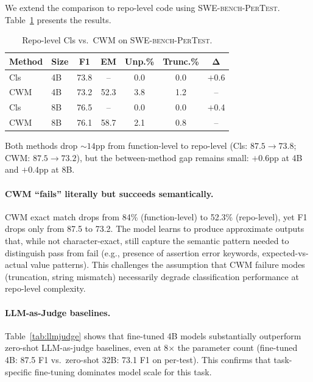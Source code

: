\documentclass[11pt,a4paper]{article}
\begin{document}
We extend the comparison to repo-level code using \textsc{SWE-bench-PerTest}.
Table~\ref{tab:repo} presents the results.

\begin{table}[t]
\centering
\small
\caption{Repo-level Cls vs.\ CWM on \textsc{SWE-bench-PerTest}.}
\label{tab:repo}
\begin{tabular}{llccccc}
\toprule
\textbf{Method} & \textbf{Size} & \textbf{F1} & \textbf{EM} & \textbf{Unp.\%} & \textbf{Trunc.\%} & $\boldsymbol{\Delta}$ \\
\midrule
Cls & 4B & 73.8 & -- & 0.0 & 0.0 & $+$0.6 \\
CWM & 4B & 73.2 & 52.3 & 3.8 & 1.2 & -- \\
Cls & 8B & 76.5 & -- & 0.0 & 0.0 & $+$0.4 \\
CWM & 8B & 76.1 & 58.7 & 2.1 & 0.8 & -- \\
\bottomrule
\end{tabular}
\end{table}

Both methods drop ${\sim}14$pp from function-level to repo-level (Cls: $87.5 \rightarrow 73.8$; CWM: $87.5 \rightarrow 73.2$), but the between-method gap remains small: $+0.6$pp at 4B and $+0.4$pp at 8B.

\paragraph{CWM ``fails'' literally but succeeds semantically.}
CWM exact match drops from 84\% (function-level) to 52.3\% (repo-level), yet F1 drops only from 87.5 to 73.2.
The model learns to produce approximate outputs that, while not character-exact, still capture the semantic pattern needed to distinguish pass from fail (e.g., presence of assertion error keywords, expected-vs-actual value patterns).
This challenges the assumption that CWM failure modes (truncation, string mismatch) necessarily degrade classification performance at repo-level complexity.

\paragraph{LLM-as-Judge baselines.}
Table~\ref{tab:llmjudge} shows that fine-tuned 4B models substantially outperform zero-shot LLM-as-judge baselines, even at 8$\times$ the parameter count (fine-tuned 4B: 87.5 F1 vs.\ zero-shot 32B: 73.1 F1 on per-test).
This confirms that task-specific fine-tuning dominates model scale for this task.
\end{document}
